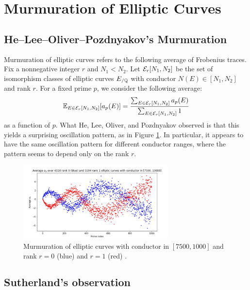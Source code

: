 \section{Murmuration of Elliptic Curves}
\label{sec:elliptic}

\subsection{He--Lee--Oliver--Pozdnyakov's Murmuration}
\label{subsec:elliptic_hlop}

Murmuration of elliptic curves refers to the following average of Frobenius traces.
Fix a nonnegative integer $r$ and $N_1 < N_2$.
Let $\mathcal{E}_r[N_1, N_2]$ be the set of isomorphism classes of elliptic curves $E_{/\mathbb{Q}}$ with conductor $N(E) \in [N_1, N_2]$ and rank $r$.
For a fixed prime $p$, we consider the following average:
\begin{equation}
    \mathbb{E}_{E \in \mathcal{E}_r[N_1, N_2]} [a_p(E)] = \frac{\sum_{E \in \mathcal{E}_r[N_1, N_2]} a_p(E)}{\sum_{E \in \mathcal{E}_r[N_1, N_2]} 1}
\end{equation}
as a function of $p$.
What He, Lee, Oliver, and Pozdnyakov \cite{he2024murmurations} observed is that this yields a surprising oscillation pattern, as in Figure \ref{fig:hlop}.
In particular, it appears to have the same oscillation pattern for different conductor ranges, where the pattern seems to depend only on the rank $r$.

\begin{figure}[htp] 
\centering
    \includegraphics[width=0.7\textwidth]{src/hlop.png}%
    \caption{Murmuration of elliptic curves with conductor in $[7500, 1000]$ and rank $r = 0$ (blue) and $r = 1$ (red) \cite{he2024murmurations}.}
\label{fig:hlop}
\end{figure}


\subsection{Sutherland's observation}
\label{subsec:elliptic_sutherland}

